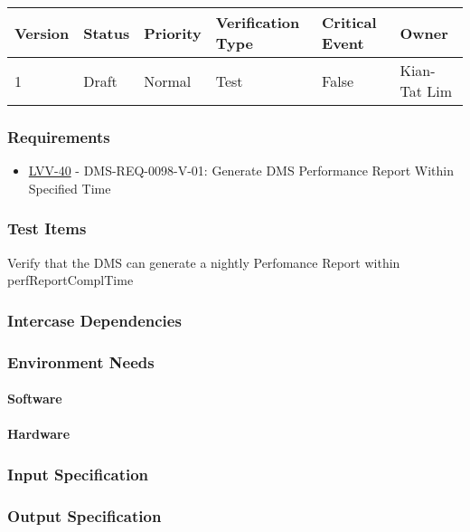 \begin{longtable}[]{llllll}
\toprule
Version & Status & Priority & Verification Type & Critical Event & Owner
\\\midrule
1 & Draft & Normal &
Test & False & Kian-Tat Lim
\\\bottomrule
\end{longtable}

\subsubsection{Requirements}
\begin{itemize}
\item \href{https://jira.lsstcorp.org/browse/LVV-40}{LVV-40} - DMS-REQ-0098-V-01: Generate DMS Performance Report Within Specified Time
\end{itemize}

\subsubsection{Test Items}
Verify that the DMS can generate a nightly Perfomance Report within
perfReportComplTime



\subsubsection{Intercase Dependencies}

\subsubsection{Environment Needs}

\paragraph{Software}

\paragraph{Hardware}

\subsubsection{Input Specification}

\subsubsection{Output Specification}

